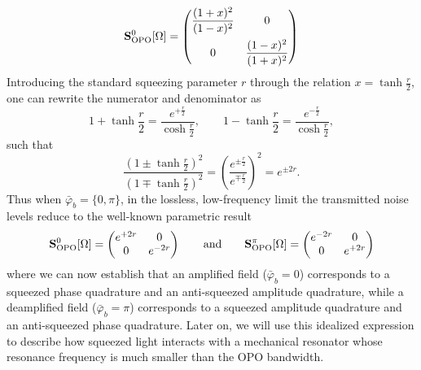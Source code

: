 \begin{equation}
      \mathbf{S}^{0}_{\rm OPO}[\Omega] =\begin{pmatrix}
         \dfrac{(1 + x)^2}{(1 - x)^2} & 0 \\[10pt]
        0 & \dfrac{(1 - x)^2}{(1 + x)^2} 
      \end{pmatrix}
\end{equation}
Introducing the standard squeezing parameter $r$ through the relation $x=\tanh \frac{r}{2}$, one can rewrite the numerator and denominator as
\begin{equation*}
1 + \tanh \frac{r}{2} = \frac{e^{+ \frac{r}{2}}}{\cosh \frac{r}{2}}, 
\qquad
1 - \tanh \frac{r}{2} = \frac{e^{- \frac{r}{2}}}{\cosh \frac{r}{2}},
\end{equation*}
such that
\begin{equation*}
\frac{(1 \pm \tanh \frac{r}{2})^2}{(1 \mp \tanh \frac{r}{2})^2}
= \left(\frac{e^{\pm \frac{r}{2}}}{e^{\mp \frac{r}{2}}}\right)^2
= e^{\pm 2r}.
\end{equation*}
Thus when $\bar\varphi_b=\{0,\pi\}$, in the lossless, low-frequency limit the transmitted noise levels reduce to the well-known parametric result
\begin{equation}
      \mathbf{S}^0_{\rm OPO}[\Omega] =\begin{pmatrix}
         e^{+ 2r} & 0 \\
        0 & e^{- 2r} 
      \end{pmatrix} \quad \quad \text{and} \quad \quad
      \mathbf{S}^\pi_{\rm OPO}[\Omega] =\begin{pmatrix}
         e^{- 2r} & 0 \\
        0 & e^{+ 2r}
      \end{pmatrix}
      \label{eq:perfect_squeezer}
\end{equation}
where we can now establish that an amplified field ($\bar\varphi_b=0$) corresponds to a squeezed phase quadrature and an anti-squeezed amplitude quadrature, while a deamplified field ($\bar\varphi_b=\pi$) corresponds to a squeezed amplitude quadrature and an anti-squeezed phase quadrature. 
Later on, we will use this idealized expression to describe how squeezed light interacts with a mechanical resonator whose resonance frequency is much smaller than the OPO bandwidth. \\

